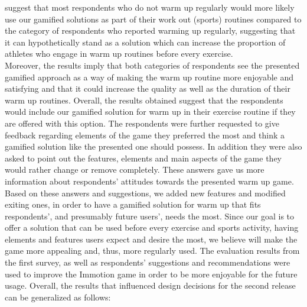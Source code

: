 suggest that most respondents who do not warm up regularly would more likely use our gamified solutions as part of their work out (sports) routines compared to the category of respondents who reported warming up regularly, suggesting that it can hypothetically stand as a solution which can increase the proportion of athletes who engage in warm up routines before every exercise. \\Moreover, the results imply that both categories of respondents see the presented gamified approach as a way of making the warm up routine more enjoyable and satisfying and that it could increase the quality as well as the duration of their warm up routines. Overall, the results obtained suggest that the respondents would include our gamified solution for warm up in their exercise routine if they are offered with this option. The respondents were further requested to give feedback regarding elements of the game they preferred the most and think a gamified solution like the presented one should possess. In addition they were also asked to point out the features, elements and main aspects of the game they would rather change or remove completely. These answers gave us more information about respondents' attitudes towards the presented warm up game. Based on these answers and suggestions, we added new features and modified exiting ones, in order to have a gamified solution for warm up that fits respondents', and presumably future users', needs the most. Since our goal is to offer a solution that can be used before every exercise and sports activity, having elements and features users expect and desire the most, we believe will make the game more appealing and, thus, more regularly used. The evaluation results from the first survey, as well as respondents' suggestions and recommendations were used to improve the Immotion game in order to be more enjoyable for the future usage. Overall, the results that influenced design decisions for the second release can be generalized as follows:
